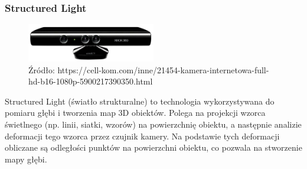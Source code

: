\documentclass[magisterska]{pracadypl}
\begin{document}
\subsubsection{Structured Light}

\begin{figure}[h]  %
    \centering  %
    \includegraphics[width=0.5\textwidth]{images/POINTCLOUD.png}  %
    \captionsetup{labelformat=empty, font=footnotesize}
    \caption{Źródło: https://cell-kom.com/inne/21454-kamera-internetowa-full-hd-b16-1080p-5900217390350.html}
    \label{fig:mono}  %
\end{figure}

Structured Light (światło strukturalne) to technologia wykorzystywana do pomiaru głębi i tworzenia map 3D obiektów. Polega na projekcji wzorca świetlnego (np. linii, siatki, wzorów) na powierzchnię obiektu, a następnie analizie deformacji tego wzorca przez czujnik kamery. Na podstawie tych deformacji obliczane są odległości punktów na powierzchni obiektu, co pozwala na stworzenie mapy głębi.
\end{document}
